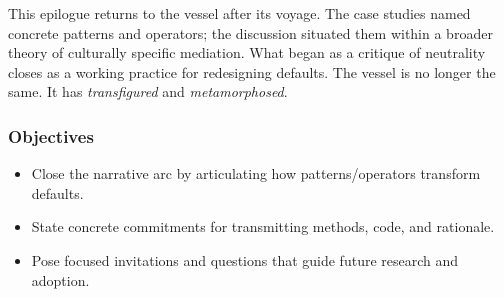 

This epilogue returns to the vessel after its voyage. The case studies named concrete patterns and operators; the discussion situated them within a broader theory of culturally specific mediation. What began as a critique of neutrality closes as a working practice for redesigning defaults. The vessel is no longer the same. It has \textit{transfigured} and \textit{metamorphosed}.

\subsubsection{Objectives}
\begin{itemize}[noitemsep]
	\item Close the narrative arc by articulating how patterns/operators transform defaults.
	\item State concrete commitments for transmitting methods, code, and rationale.
	\item Pose focused invitations and questions that guide future research and adoption.
\end{itemize}

